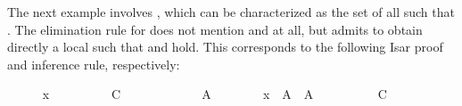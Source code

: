 \begin{isabellebody}
\begin{isamarkuptext}
  \medskip The next example involves \isa{{\isachardoublequote}{\isasymUnion}{\isasymA}{\isachardoublequote}}, which can be
  characterized as the set of all  such that .  The elimination rule for  does
  not mention \isa{{\isachardoublequote}{\isasymexists}{\isachardoublequote}} and \isa{{\isachardoublequote}{\isasymand}{\isachardoublequote}} at all, but admits to obtain
  directly a local  such that  and  hold.  This corresponds to the following Isar proof and
  inference rule, respectively:%
\end{isamarkuptext}%
\isamarkuptrue%
%
\medskip\begin{minipage}{0.6\textwidth}
%
\isadelimproof
\ \ \ \ %
\endisadelimproof
%
\isatagproof
{}\isamarkupfalse%
\ {\isachardoublequoteopen}x\ {\isasymin}\ {\isasymUnion}{\isasymA}{\isachardoublequoteclose}\isanewline
\ \ \ \ \isamarkupfalse%
\ \isamarkupfalse%
\ C\isanewline
\ \ \ \ \isamarkupfalse%
\isanewline
\ \ \ \ \ \ \isamarkupfalse%
\ A\isanewline
\ \ \ \ \ \ \isamarkupfalse%
\ {\isachardoublequoteopen}x\ {\isasymin}\ A{\isachardoublequoteclose}\ \ {\isachardoublequoteopen}A\ {\isasymin}\ {\isasymA}{\isachardoublequoteclose}\isanewline
\ \ \ \ \ \ \isamarkupfalse%
\ C%
\endisatagproof
{\isafoldproof}%
%
\isadelimproof
%
\endisadelimproof
%
\isadelimnoproof
\ %
\endisadelimnoproof
%
\isatagnoproof
{}\isamarkupfalse%
%
\endisatagnoproof
{\isafoldnoproof}%
%
\isadelimnoproof
%
\endisadelimnoproof
\isanewline
%
\isadelimproof
\ \ \ \ %
\endisadelimproof
%
\isatagproof
{}\isamarkupfalse%
%
\endisatagproof
{\isafoldproof}%
%
\isadelimproof
%
\endisadelimproof
%
\end{minipage}\begin{minipage}{0.4\textwidth}
%
\begin{isamarkuptext}%
%

\end{isamarkuptext}
\end{minipage}
\end{isabellebody}

